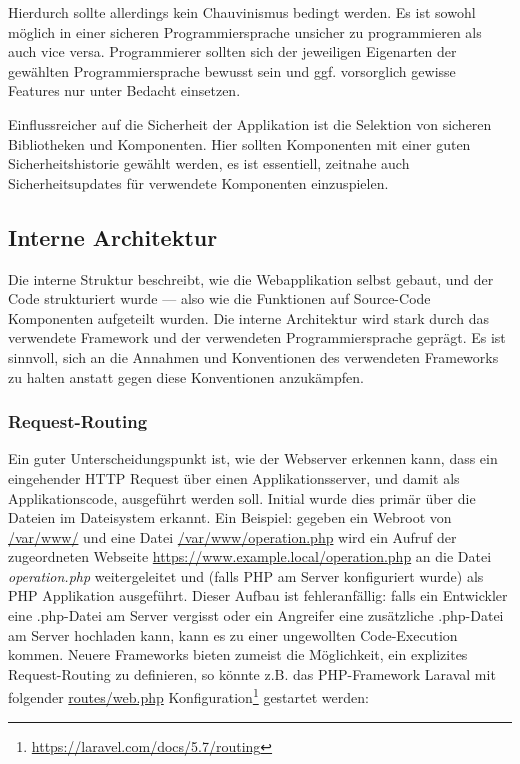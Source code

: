 Hierdurch sollte allerdings kein Chauvinismus bedingt werden. Es ist sowohl möglich in einer sicheren Programmiersprache unsicher zu programmieren als auch vice versa. Programmierer sollten sich der jeweiligen Eigenarten der gewählten Programmiersprache bewusst sein und ggf. vorsorglich gewisse Features nur unter Bedacht einsetzen.

Einflussreicher auf die Sicherheit der Applikation ist die Selektion von sicheren Bibliotheken und Komponenten. Hier sollten Komponenten mit einer guten Sicherheitshistorie gewählt werden, es ist essentiell, zeitnahe auch Sicherheitsupdates für verwendete Komponenten einzuspielen.

\subsection{Interne Architektur}

Die interne Struktur beschreibt, wie die Webapplikation selbst gebaut, und der Code strukturiert wurde --- also wie die Funktionen auf Source-Code Komponenten aufgeteilt wurden. Die interne Architektur wird stark durch das verwendete Framework und der verwendeten Programmiersprache geprägt. Es ist sinnvoll, sich an die Annahmen und Konventionen des verwendeten Frameworks zu halten anstatt gegen diese Konventionen anzukämpfen.

\subsubsection{Request-Routing}

Ein guter Unterscheidungspunkt ist, wie der Webserver erkennen kann, dass ein eingehender HTTP Request über einen Applikationsserver, und damit als Applikationscode, ausgeführt werden soll. Initial wurde dies primär über die Dateien im Dateisystem erkannt. Ein Beispiel: gegeben ein Webroot von \url{/var/www/} und eine Datei \url{/var/www/operation.php} wird ein Aufruf der zugeordneten Webseite \url{https://www.example.local/operation.php} an die Datei \textit{operation.php} weitergeleitet und (falls PHP am Server konfiguriert wurde) als PHP Applikation ausgeführt. Dieser Aufbau ist fehleranfällig: falls ein Entwickler eine .php-Datei am Server vergisst oder ein Angreifer eine zusätzliche .php-Datei am Server hochladen kann, kann es zu einer ungewollten Code-Execution kommen. Neuere Frameworks bieten zumeist die Möglichkeit, ein explizites Request-Routing zu definieren, so könnte z.B. das PHP-Framework Laraval mit folgender \url{routes/web.php} Konfiguration\footnote{\url{https://laravel.com/docs/5.7/routing}} gestartet werden:

